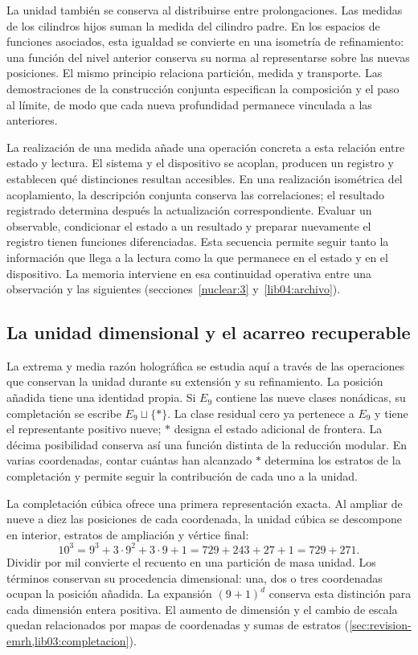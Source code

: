 La unidad también se conserva al distribuirse entre prolongaciones.
Las medidas de los cilindros hijos suman la medida del cilindro padre.
En los espacios de funciones asociados, esta igualdad se convierte en
una isometría de refinamiento: una función del nivel anterior conserva
su norma al representarse sobre las nuevas posiciones. El mismo
principio relaciona partición, medida y transporte. Las demostraciones
de la construcción conjunta especifican la composición y el paso al
límite, de modo que cada nueva profundidad permanece vinculada a las
anteriores.

La realización de una medida añade una operación concreta a esta relación
entre estado y lectura. El sistema y el dispositivo se acoplan, producen
un registro y establecen qué distinciones resultan accesibles. En una
realización isométrica del acoplamiento, la descripción conjunta conserva
las correlaciones; el resultado registrado determina después la
actualización correspondiente. Evaluar un observable, condicionar el
estado a un resultado y preparar nuevamente el registro tienen funciones
diferenciadas. Esta secuencia permite seguir tanto la información que
llega a la lectura como la que permanece en el estado y en el dispositivo.
La memoria interviene en esa continuidad operativa entre una observación
y las siguientes (secciones~\ref{nuclear:3} y~\ref{lib04:archivo}).

\subsection*{La unidad dimensional y el acarreo recuperable}
\label{libnar:unidad}

La extrema y media razón holográfica se estudia aquí a través de las
operaciones que conservan la unidad durante su extensión y su
refinamiento. La posición añadida tiene una identidad propia. Si
\(E_9\) contiene las nueve clases nonádicas, su completación se escribe
\(E_9\sqcup\{\ast\}\). La clase residual cero ya pertenece a
\(E_9\) y tiene el representante positivo nueve; \(\ast\) designa
el estado adicional de frontera. La décima posibilidad conserva así una
función distinta de la reducción modular. En varias coordenadas, contar
cuántas han alcanzado \(\ast\) determina los estratos de la completación
y permite seguir la contribución de cada uno a la unidad.

La completación cúbica ofrece una primera representación
exacta. Al ampliar de nueve a diez las posiciones de cada coordenada,
la unidad cúbica se descompone en interior, estratos de ampliación y
vértice final:
\[
 10^3=9^3+3\cdot9^2+3\cdot9+1
     =729+243+27+1=729+271.
\]
Dividir por mil convierte el recuento en una partición de masa unidad.
Los términos conservan su procedencia dimensional: una, dos o tres
coordenadas ocupan la posición añadida. La expansión
\((9+1)^d\) conserva esta distinción para cada dimensión entera
positiva. El aumento de dimensión y el cambio de escala quedan
relacionados por mapas de coordenadas y sumas de estratos
(\cref{sec:revision-emrh,lib03:completacion}).

